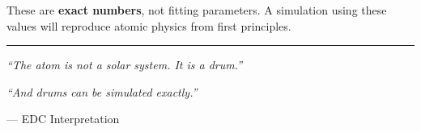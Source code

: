 These are \textbf{exact numbers}, not fitting parameters. A simulation using these values will reproduce atomic physics from first principles.

\vspace{2em}
\begin{center}
\rule{0.5\textwidth}{0.4pt}

\textit{``The atom is not a solar system. It is a drum.''}

\vspace{0.5em}

\textit{``And drums can be simulated exactly.''}

--- EDC Interpretation
\end{center}

